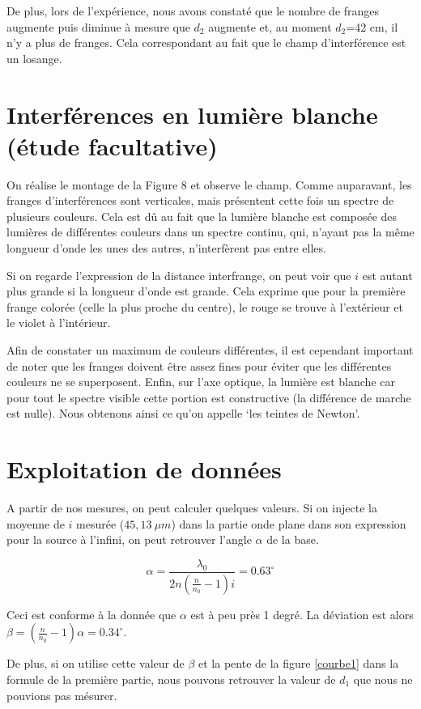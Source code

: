 \documentclass[11pt, a4paper]{article}
\begin{document}
De plus, lors de l'expérience, nous avons constaté que le nombre de franges augmente puis diminue à mesure que $d_2$ augmente et, au moment $d_2$=42 cm, il n'y a plus de franges. Cela correspondant au fait que le champ d'interférence est un losange.


\section{Interférences en lumière blanche (étude facultative)}
On réalise le montage de la Figure 8 et observe le champ. Comme auparavant, les franges d'interférences sont verticales, mais présentent cette fois un spectre de plusieurs couleurs. Cela est dû au fait que la lumière blanche est composée des lumières de différentes couleurs dans un spectre continu, qui, n'ayant pas la même longueur d'onde les unes des autres, n'interfèrent pas entre elles.

Si on regarde l'expression de la distance interfrange, on peut voir que $i$ est autant plus grande si la longueur d'onde est grande. Cela exprime que pour la première frange colorée (celle la plus proche du centre), le rouge se trouve à l'extérieur et le violet à l'intérieur.

Afin de constater un maximum de couleurs différentes, il est cependant important de noter que les franges doivent être assez fines pour éviter que les différentes couleurs ne se superposent. Enfin, sur l'axe optique, la lumière est blanche car pour tout le spectre visible cette portion est constructive (la différence de marche est nulle). Nous obtenons ainsi ce qu'on appelle ‘les teintes de Newton'.

\section{Exploitation de données}
A partir de nos mesures, on peut calculer quelques valeurs. Si on injecte la moyenne de $i$ mesurée ($45,13\ \mu m$) dans la partie onde plane dans son expression pour la source à l'infini, on peut retrouver l'angle $\alpha$ de la base.

$$
    \alpha =  \frac{\lambda_0}{2n\left(\frac{n}{n_0}-1\right)i} = 0.63^\circ
$$

Ceci est conforme à la donnée que $\alpha$ est à peu près 1 degré. La déviation est alors $\beta=\left(\frac{n}{n_0}-1\right)\alpha=0.34^\circ$.

De plus, si on utilise cette valeur de $\beta$ et la pente de la figure \ref{courbe1} dans la formule de la première partie, nous pouvons retrouver la valeur de $d_1$ que nous ne pouvions pas mésurer.
\end{document}
